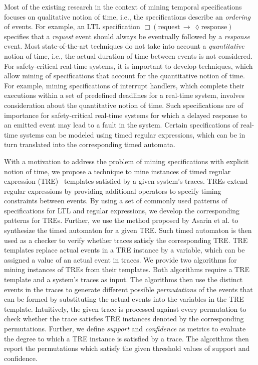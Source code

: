 \documentclass[]{sigplanconf}
\begin{document}
Most of the existing research in the context of mining temporal specifications focuses on qualitative notion of time, i.e., the specifications describe an \emph{ordering} of events. For example, an LTL specification $\Box(\mathrm{request}\,\rightarrow\,\lozenge \mathrm{response})$ specifies that a \emph{request} event should always be eventually followed by a \emph{response} event. Most state-of-the-art techniques do not take into account a \emph{quantitative } notion of time, i.e., the actual duration of time between events is not considered. For safety-critical real-time systems, it is important to develop techniques, which allow mining of specifications that account for the quantitative notion of time. For example, mining specifications of interrupt handlers, which complete their executions within a set of predefined deadlines for a real-time system, involves consideration about the quantitative notion of time. Such specifications are of importance for safety-critical real-time systems for which a delayed response to an emitted event may lead to a fault in the system. Certain specifications of real-time systems can be modeled using timed regular expressions, which can be in turn translated into the corresponding timed automata.

With a motivation to address the problem of mining specifications with explicit notion of time, we propose a technique to mine instances of timed regular expression (TRE)~\cite{timedregex} templates satisfied by a given system's traces. TREs extend regular expressions by providing additional operators to specify timing constraints between events. By using a set of commonly used patterns of specifications for LTL and regular expressions, we develop the corresponding patterns for TREs. Further, we use the method proposed by Asarin et al. to synthesize the timed automaton for a given TRE. Such timed automaton is then used as a checker to verify whether traces satisfy the corresponding TRE. TRE templates replace actual events in a TRE instance by a variable, which can be assigned a value of an actual event in traces. We provide two algorithms for mining instances of TREs from their templates. Both algorithms require a TRE template and a system's traces as input. The algorithms then use the distinct events in the traces to generate different possible \emph{permutations} of the events that can be formed by substituting the actual events into the variables in the TRE template. Intuitively, the given trace is processed against every permutation to check whether the trace satisfies TRE instances denoted by the corresponding permutations. Further, we define \emph{support} and \emph{confidence} as metrics to evaluate the degree to which a TRE instance is satisfied by a trace. The algorithms then report the permutations which satisfy the given threshold values of support and confidence.
\end{document}
